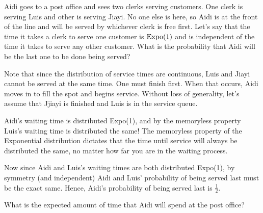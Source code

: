 \documentclass[11pt]{article}
\begin{document}
\begin{exercise}
Aidi goes to a post office and sees two clerks serving customers. One clerk is serving Luis and other is serving Jiayi. No one else is here, so Aidi is at the front of the line and will be served by whichever clerk is free first. Let's say that the time it takes a clerk to serve one customer is $\textrm{Expo}(1)$ and is independent of the time it takes to serve any other customer. What is the probability that Aidi will be the last one to be done being served?
\end{exercise}

\begin{solution}
Note that since the distribution of service times are continuous, Luis and Jiayi cannot be served at
the same time. One must finish first. When that occurs, Aidi moves in to fill the spot and begins
service. Without loss of generality, let’s assume that Jjiayi is finished and Luis is in the service queue.

Aidi’s waiting time is distributed Expo(1), and by the memoryless property Luis’s waiting time is
distributed the same! The memoryless property of the Exponential distribution dictates that the time until service will always be distributed the same, no matter how far you are in the waiting process.

Now since Aidi and Luis’s waiting times are both distributed Expo(1), by symmetry (and independent) Aidi and Luis' probability of being served last must be the exact same. Hence, Aidi’s probability of being served last is $\frac{1}{2}$.
\end{solution}

\begin{exercise}
What is the expected amount of time that Aidi will spend at the post office?
\end{exercise}
\end{document}

